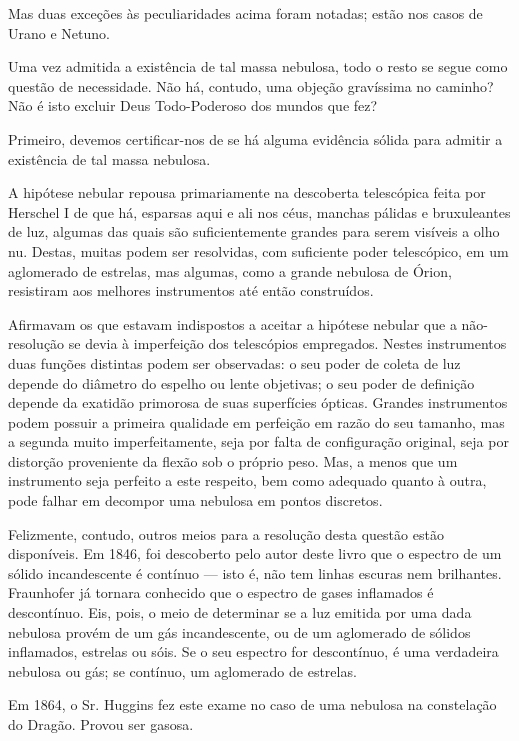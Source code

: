 \documentclass[11pt,a5paper,twoside,openany]{book}
\begin{document}
Mas duas exceções às peculiaridades acima foram notadas; estão nos casos de Urano e Netuno.

Uma vez admitida a existência de tal massa nebulosa, todo o resto se segue como questão de necessidade. Não há, contudo, uma objeção gravíssima no caminho? Não é isto excluir Deus Todo-Poderoso dos mundos que fez?

Primeiro, devemos certificar-nos de se há alguma evidência sólida para admitir a existência de tal massa nebulosa.

A hipótese nebular repousa primariamente na descoberta telescópica feita por Herschel I de que há, esparsas aqui e ali nos céus, manchas pálidas e bruxuleantes de luz, algumas das quais são suficientemente grandes para serem visíveis a olho nu. Destas, muitas podem ser resolvidas, com suficiente poder telescópico, em um aglomerado de estrelas, mas algumas, como a grande nebulosa de Órion, resistiram aos melhores instrumentos até então construídos.

Afirmavam os que estavam indispostos a aceitar a hipótese nebular que a não-resolução se devia à imperfeição dos telescópios empregados. Nestes instrumentos duas funções distintas podem ser observadas: o seu poder de coleta de luz depende do diâmetro do espelho ou lente objetivas; o seu poder de definição depende da exatidão primorosa de suas superfícies ópticas. Grandes instrumentos podem possuir a primeira qualidade em perfeição em razão do seu tamanho, mas a segunda muito imperfeitamente, seja por falta de configuração original, seja por distorção proveniente da flexão sob o próprio peso. Mas, a menos que um instrumento seja perfeito a este respeito, bem como adequado quanto à outra, pode falhar em decompor uma nebulosa em pontos discretos.

Felizmente, contudo, outros meios para a resolução desta questão estão disponíveis. Em 1846, foi descoberto pelo autor deste livro que o espectro de um sólido incandescente é contínuo — isto é, não tem linhas escuras nem brilhantes. Fraunhofer já tornara conhecido que o espectro de gases inflamados é descontínuo. Eis, pois, o meio de determinar se a luz emitida por uma dada nebulosa provém de um gás incandescente, ou de um aglomerado de sólidos inflamados, estrelas ou sóis. Se o seu espectro for descontínuo, é uma verdadeira nebulosa ou gás; se contínuo, um aglomerado de estrelas.

Em 1864, o Sr. Huggins fez este exame no caso de uma nebulosa na constelação do Dragão. Provou ser gasosa.
\end{document}
